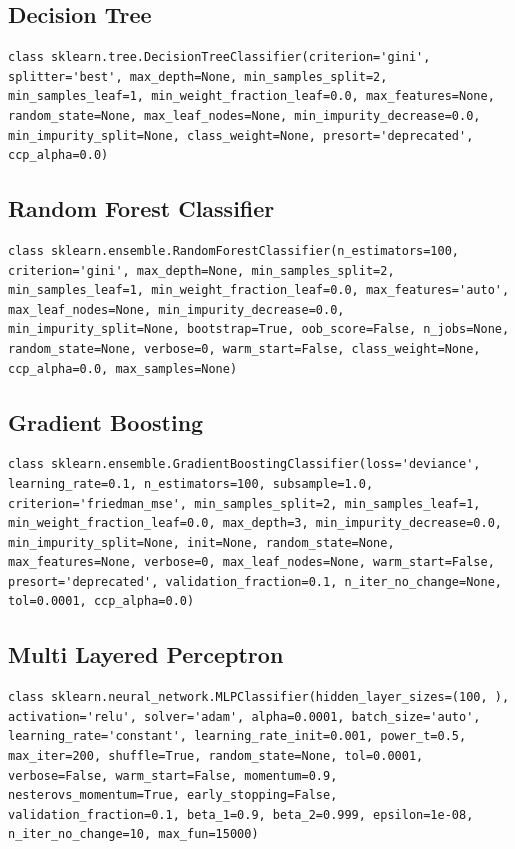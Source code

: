 \documentclass[12pt]{article}
\begin{document}
\subsection{Decision Tree}
\begin{lstlisting}
class sklearn.tree.DecisionTreeClassifier(criterion='gini', splitter='best', max_depth=None, min_samples_split=2, min_samples_leaf=1, min_weight_fraction_leaf=0.0, max_features=None, random_state=None, max_leaf_nodes=None, min_impurity_decrease=0.0, min_impurity_split=None, class_weight=None, presort='deprecated', ccp_alpha=0.0)
\end{lstlisting}

\subsection{Random Forest Classifier}
\begin{lstlisting}
class sklearn.ensemble.RandomForestClassifier(n_estimators=100, criterion='gini', max_depth=None, min_samples_split=2, min_samples_leaf=1, min_weight_fraction_leaf=0.0, max_features='auto', max_leaf_nodes=None, min_impurity_decrease=0.0, min_impurity_split=None, bootstrap=True, oob_score=False, n_jobs=None, random_state=None, verbose=0, warm_start=False, class_weight=None, ccp_alpha=0.0, max_samples=None)
\end{lstlisting}

\subsection{Gradient Boosting}
\begin{lstlisting}
class sklearn.ensemble.GradientBoostingClassifier(loss='deviance', learning_rate=0.1, n_estimators=100, subsample=1.0, criterion='friedman_mse', min_samples_split=2, min_samples_leaf=1, min_weight_fraction_leaf=0.0, max_depth=3, min_impurity_decrease=0.0, min_impurity_split=None, init=None, random_state=None, max_features=None, verbose=0, max_leaf_nodes=None, warm_start=False, presort='deprecated', validation_fraction=0.1, n_iter_no_change=None, tol=0.0001, ccp_alpha=0.0)
\end{lstlisting}

\newpage
\subsection{Multi Layered Perceptron}
\begin{lstlisting}
class sklearn.neural_network.MLPClassifier(hidden_layer_sizes=(100, ), activation='relu', solver='adam', alpha=0.0001, batch_size='auto', learning_rate='constant', learning_rate_init=0.001, power_t=0.5, max_iter=200, shuffle=True, random_state=None, tol=0.0001, verbose=False, warm_start=False, momentum=0.9, nesterovs_momentum=True, early_stopping=False, validation_fraction=0.1, beta_1=0.9, beta_2=0.999, epsilon=1e-08, n_iter_no_change=10, max_fun=15000)
\end{lstlisting}
\end{document}
